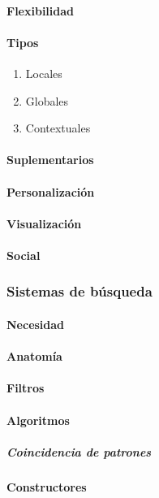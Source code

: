 \documentclass[12pt]{report}
\begin{document}
				\paragraph{Flexibilidad}
				\paragraph{Tipos}
					\begin{enumerate}
						\item Locales
						\item Globales
						\item Contextuales
					\end{enumerate}
				\paragraph{Suplementarios}
				\paragraph{Personalización}
				\paragraph{Visualización}
				\paragraph{Social}
			\subsubsection{Sistemas de búsqueda}
				\paragraph{Necesidad}
				\paragraph{Anatomía}
				\paragraph{Filtros}
				\paragraph{Algoritmos}
					\subparagraph{Coincidencia de patrones}
				\paragraph{Constructores}
\end{document}
